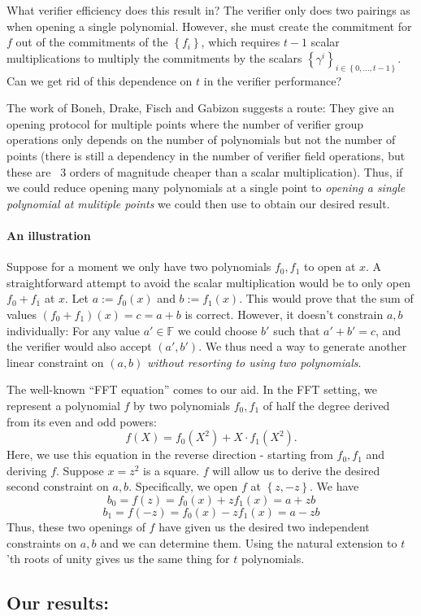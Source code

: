 \documentclass[11pt]{article} %
\newcommand{\F}{\ensuremath{\mathbb F}\xspace}
\newcommand{\defeq}{:=}
\newcommand{\setD}[1]{\ensuremath{\set{#1}_{i\in \set{0,\ldots,t-1}}}\xspace}
\newcommand{\set}[1]{\ensuremath{\left\{#1\right\}}\xspace}
\newcommand{\prg}[1]{ \paragraph{\textbf{#1}}}
\begin{document}
What verifier efficiency does this result in?
The verifier only does two pairings as when opening a single polynomial. However, she must create the commitment for $f$ out of the commitments of the \set{f_i}, which requires $t-1$ scalar multiplications to multiply the commitments by the scalars \setD{\gamma^i}.
Can we get rid of this dependence on $t$ in the verifier performance?

The work of Boneh, Drake, Fisch and Gabizon \cite{shplonk} suggests a route:
They give an opening protocol for multiple points where the number of verifier group operations only depends on the number of polynomials but not the number of points (there is still a dependency in the number of verifier field operations, but these are ~3 orders of magnitude cheaper than a scalar multiplication).
Thus, if we could reduce opening many polynomials at a single point to \textit{opening a single polynomial at mulitiple points} we could then use \cite{shplonk} to obtain our desired result.

\prg{An illustration}
Suppose for a moment we only have two polynomials $f_0,f_1$ to open at $x$.
A straightforward attempt to avoid the scalar multiplication would be to only open $f_0+f_1$ at $x$.
Let $a\defeq f_0(x)$ and $b\defeq f_1(x)$. This would prove that the sum of values $(f_0+f_1)(x) = c=a+b$ is correct.
However, it doesn't constrain $a,b$ individually: For  any value $a'\in \F$ we could choose $b'$ such that $a'+b'=c$,
and the verifier would also accept $(a',b')$. We thus need a way to generate another linear constraint on $(a,b)$ \textit{without resorting to using two polynomials}.

The well-known ``FFT equation'' comes to our aid.
In the FFT setting,  we represent a polynomial $f$  by two polynomials $f_0,f_1$ of half the degree derived from its even and odd powers:
\[f(X) = f_0(X^2)+X\cdot f_1(X^2).\]
Here, we use this equation in the reverse direction - starting from $f_0,f_1$ and deriving $f$.
Suppose $x=z^2$ is a square. $f$ will allow us to derive the desired second constraint on $a,b$. Specifically, we open $f$ at \set{z,-z}. We have
\[b_0=f(z)=f_0(x)+z f_1(x) = a+zb\]
\[b_1=f(-z)=f_0(x)-z f_1(x) = a-zb\]
Thus, these two openings of $f$ have given us the desired two independent constraints on $a,b$ and we can determine them.
Using the natural extension to $t$'th roots of unity gives us the same thing for $t$ polynomials.
\subsection{Our results:}
\end{document}
